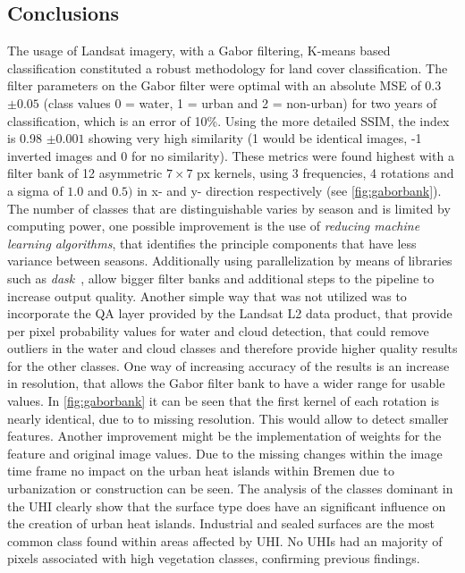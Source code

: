 \documentclass[12pt,a4paper, english,twoside]{scrartcl}
\begin{document}
 \subsection{Conclusions}
    The usage of Landsat imagery, with a Gabor filtering, K-means based classification constituted a robust methodology for land cover classification.
    The filter parameters on the Gabor filter were optimal with an absolute MSE of 0.3 $\pm 0.05$ (class values 0 = water, 1 = urban and 2 = non-urban) for two years of classification, which is an error of 10\%.
    Using the more detailed \gls{SSIM}, the index is 0.98 $\pm 0.001$ showing very high similarity (1 would be identical images, -1 inverted images and 0 for no similarity). 
    These metrics were found highest with a filter bank of 12 asymmetric $7\times7$ px kernels, using 3 frequencies, 4 rotations and a sigma of $1.0$ and $0.5)$ in x- and y- direction respectively (see \cref{fig:gaborbank}).
    The number of classes that are distinguishable varies by season and is limited by computing power, one possible improvement is the use of \textit{reducing machine learning algorithms}, that identifies the principle components that have less variance between seasons.
    Additionally using parallelization by means of libraries such as \textit{dask}~\autocite{dask}, allow bigger filter banks and additional steps to the pipeline to increase output quality.
    Another simple way that was not utilized was to incorporate the QA layer provided by the Landsat L2 data product, that provide per pixel probability values for water and cloud detection, that could remove outliers in the water and cloud classes and therefore provide higher quality results for the other classes. 
    One way of increasing accuracy of the results is an increase in resolution, that allows the Gabor filter bank to have a wider range for usable values. 
    In \cref{fig:gaborbank} it can be seen that the first kernel of each rotation is nearly identical, due to to missing resolution. 
    This would allow to detect smaller features.
    Another improvement might be the implementation of weights for the feature and original image values.
    Due to the missing changes within the image time frame no impact on the urban heat islands within Bremen due to urbanization or construction can be seen. 
    The analysis of the classes dominant in the \gls{UHI} clearly show that the surface type does have an significant influence on the creation of urban heat islands. 
    Industrial and sealed surfaces are the most common class found within areas affected by \gls{UHI}.
    No \glspl{UHI} had an majority of pixels associated with high vegetation classes, confirming previous findings. 
    
\end{document}
